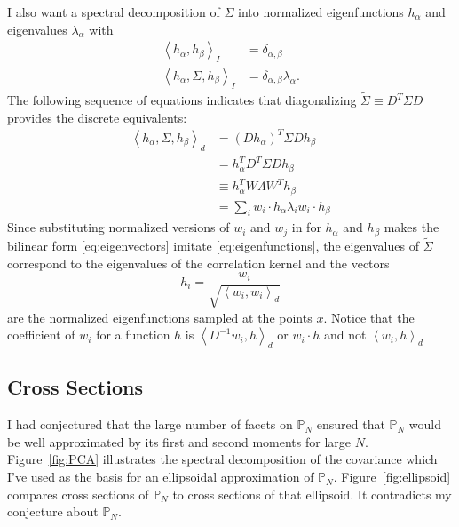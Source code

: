 \documentclass[]{article}
\newcommand{\field}[1]{\mathbb{#1}}
\newcommand\Polytope[1]{\field{P}_{#1}}
\newcommand\PolytopeN{\Polytope{N}}
\newcommand\inner[2]{\left<#1,#2\right>}
\begin{document}
I also want a spectral decomposition of $\Sigma$ into normalized
eigenfunctions $h_\alpha$ and eigenvalues $\lambda_\alpha$ with
\begin{subequations}
  \label{eq:eigenfunctions}
  \begin{align}
    \inner{h_\alpha}{h_\beta}_I &= \delta_{\alpha,\beta} \\
    \inner{h_\alpha, \Sigma}{h_\beta}_I &= \delta_{\alpha,\beta}
    \lambda_\alpha.
  \end{align}
\end{subequations}
The following sequence of equations indicates that diagonalizing
$\tilde \Sigma \equiv D^T\Sigma D$ provides the discrete equivalents:
\begin{align}
  \inner{h_\alpha, \Sigma}{h_\beta}_d &= (D h_\alpha)^T \Sigma D
  h_\beta \\
  &= h_\alpha^T D^T \Sigma D h_\beta \\
  &\equiv h_\alpha^T W \Lambda W^T h_\beta \\
  \label{eq:eigenvectors}
  &= \sum_i w_i \cdot h_\alpha \lambda_i w_i \cdot h_\beta
\end{align}
Since substituting normalized versions of $w_i$ and $w_j$ in for
$h_\alpha$ and $h_\beta$ makes the bilinear form
\eqref{eq:eigenvectors} imitate \ref{eq:eigenfunctions}, the
eigenvalues of $\tilde \Sigma$ correspond to the eigenvalues of the
correlation kernel and the vectors
\begin{equation*}
  h_i = \frac{w_i}{\sqrt{\inner{w_i}{w_i}_d}}
\end{equation*}
are the normalized eigenfunctions sampled at the points $x$.  Notice
that the coefficient of $w_i$ for a function $h$ is $\inner{D^{-1}
  w_i}{h}_d$ or $w_i\cdot h$ and not $\inner{w_i}{h}_d$

\subsection{Cross Sections}
\label{sec:cross-sections}

I had conjectured that the large number of facets on $\PolytopeN$
ensured that $\PolytopeN$ would be well approximated by its first and
second moments for large $N$.  Figure~\ref{fig:PCA} illustrates the
spectral decomposition of the covariance which I've used as the basis
for an ellipsoidal approximation of $\PolytopeN$.
Figure~\ref{fig:ellipsoid} compares cross sections of $\PolytopeN$ to
cross sections of that ellipsoid.  It contradicts my conjecture about
$\PolytopeN$.
\end{document}
